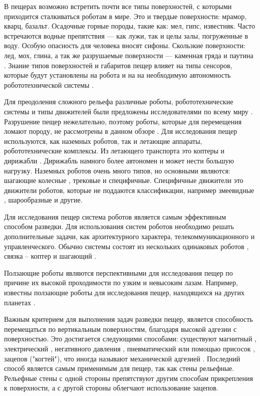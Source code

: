 В пещерах возможно встретить почти все типы поверхностей, с которыми приходится сталкиваться роботам в мире. Это и твердые поверхности: мрамор, кварц, базальт. Осадочные горные породы, такие как: мел, гипс, известняк. Часто встречаются водные препятствия — как лужи, так и целы залы, погруженные в воду. Особую опасность для человека вносят сифоны. Скользкие поверхности: лед, мох, глина, а так же разрушаемые поверхности — каменная гряда и паутина \cite{1960,1963,1969,1971}. Знание типов поверхностей и габаритов пещер влияет на типы сенсоров, которые будут установлены на робота и на на необходимую автономность робототехнической системы \cite{Mascarich2018a}. 

Для преодоления сложного рельефа различные роботы, робототехнические системы и типы движителей были предложены исследователями по всему миру \cite{Morris2006a}. Разрушение пещер нежелательно, поэтому роботы, которые для перемещения ломают породу, не рассмотрены в данном обзоре \cite{Semini2016}. Для исследования пещер используются, как наземных роботов, так и летающие аппараты, робототехнические комплексы. Из летающего транспорта это коптеры \cite{Papachristos2019,Scaramuzza2014,zinggMAVNavigationIndoor2010} и дирижабли \cite{Huang2019}. Дирижабль намного более автономен и может нести большую нагрузку. Наземных роботов очень много типов, но основными являются: шагающие \cite{Tan2016,Lynch2019} колесные \cite{Molyneaux2016,Vaquero2018}, трековые \cite{Reddy2015} и специфичные. Специфичные движители это движители роботов, которые не поддаются классификации, например змеевидные \cite{Ye2007,Borenstein2007}, шарообразные \cite{Thangavelautham2017,Dubowsky2008,Dang2019} и другие.

Для исследования пещер система роботов является самым эффективным способом разведки. Для использования систем роботов необходимо решать дополнительные задачи, как архитектурного характера, телекоммуникационного и управленческого. Обычно системы состоят из нескольких одинаковых роботов \cite{Vaquero2018}, связка – коптер и шагающий \cite{Chen2010,Cantelli2013}.

Ползающие роботы \cite{Schmidt2013} являются перспективными для исследования пещер по причине их высокой проходимости по узким и невысоким лазам. Например, известны ползающие роботы для исследования пещер, находящихся на других планетах \cite{Parness2017}. 

Важным критерием для выполнения задач разведки пещер, является способность перемещаться по вертикальным поверхностям, благодаря высокой адгезии с поверхностью. Это достигается следующими способами: существуют магнитный \cite{Lee2012,tavakoliOmniClimberOmnidirectionalLight2012,Kotay1996,Xu2017}, электрический \cite{Li2017}, негативного давления \cite{Lee2012,tavakoliOmniClimberOmnidirectionalLight2012,Papachristos2019}, пневматический или помощью присосок \cite{Nagakubo1994,Tlale2012}, зацепов ("когтей"), что иногда называют механической адгезией \cite{Parness2017,Bretl2006,SangbaeKim2005,Sintov2011}. Последний способ является самым применимым для пещер, так как стены рельефные. Рельефные стены с одной стороны препятствуют другим способам прикрепления к поверхности, а с другой стороны облегчают использование зацепов.


